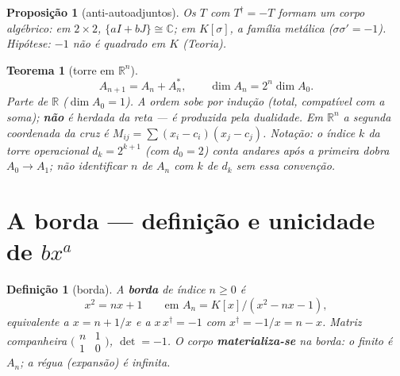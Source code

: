 \documentclass[11pt,a4paper]{article}
\newtheorem{definicao}{Definição}
\newtheorem{teorema}{Teorema}
\newtheorem{proposicao}{Proposição}
\begin{document}
\begin{proposicao}[anti-autoadjuntos]\label{prop:anti}
Os $T$ com $T^{\dagger}=-T$ formam um corpo algébrico: em $2\times2$,
$\{aI+bJ\}\cong\mathbb{C}$; em $K[\sigma]$, a família metálica
($\sigma\sigma'=-1$). Hipótese: $-1$ não é quadrado em $K$
(\emph{Teoria}).
\end{proposicao}

\begin{teorema}[torre em $\mathbb{R}^{n}$]\label{thm:rn}
\[
A_{n+1}=A_n+A_n^{*},
\qquad
\dim A_n=2^{n}\dim A_0.
\]
Parte de $\mathbb{R}$ ($\dim A_0=1$). A ordem sobe por indução (total,
compatível com a soma); \textbf{não} é herdada da reta --- é produzida
pela dualidade. Em $\mathbb{R}^{n}$ a segunda coordenada da cruz é
$M_{ij}=\sum(x_i-c_i)(x_j-c_j)$.
\emph{Notação:} o índice $k$ da torre operacional
$d_k=2^{k+1}$ (com $d_0=2$) conta andares \emph{após} a primeira
dobra $A_0\to A_1$; não identificar $n$ de $A_n$ com $k$ de $d_k$ sem
essa convenção.
\end{teorema}

\section{A borda --- definição e unicidade de $bx^{a}$}

\begin{definicao}[borda]\label{def:borda}
A \textbf{borda} de índice $n\geq0$ é
\[
x^{2}=nx+1
\qquad\text{em }A_n=K[x]/(x^{2}-nx-1),
\]
equivalente a $x=n+1/x$ e a $x\,x^{\dagger}=-1$ com
$x^{\dagger}=-1/x=n-x$. Matriz companheira
$\bigl(\begin{smallmatrix}n&1\\1&0\end{smallmatrix}\bigr)$, $\det=-1$.
O corpo \textbf{materializa-se} na borda: o finito é $A_n$; a régua
(expansão) é infinita.
\end{definicao}
\end{document}
